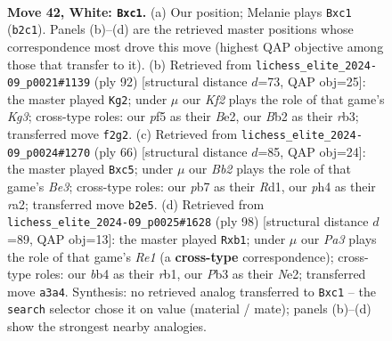 \documentclass[11pt]{article}
\begin{document}
\clearpage

\begin{figure}[p]\centering
\begin{subfigure}{0.46\textwidth}\centering
\resizebox{\linewidth}{!}{%
\newchessgame
\chessboard[
  setfen={1nb5/1p6/1n4k1/pN1p1pp1/1b4Pp/PP2P2P/1B2PK2/2rB4 w - - 0 42},
  showmover=false,
  pgfstyle=straightmove, color=movearrow, markmove={b2-c1}
]}
\caption{}
\end{subfigure}\hfill
\begin{subfigure}{0.46\textwidth}\centering
\resizebox{\linewidth}{!}{%
\newchessgame
\chessboard[
  setfen={R7/3b1pk1/2n1p2p/3pP1pP/1b1P2P1/1r1NB1K1/4BP2/8 w - - 8 47},
  showmover=false,
  pgfstyle=straightmove, color=movearrow, markmove={g3-g2}
]}
\caption{}
\end{subfigure}
\\[4pt]
\begin{subfigure}{0.46\textwidth}\centering
\resizebox{\linewidth}{!}{%
\newchessgame
\chessboard[
  setfen={2b2b2/1pp2k2/3p2p1/1PnPp3/2P1P1p1/3BB3/r3NPP1/3R2K1 w - - 7 34},
  showmover=false,
  pgfstyle=straightmove, color=movearrow, markmove={e3-c5}
]}
\caption{}
\end{subfigure}\hfill
\begin{subfigure}{0.46\textwidth}\centering
\resizebox{\linewidth}{!}{%
\newchessgame
\chessboard[
  setfen={3r4/1p3k2/2p5/p3Pnp1/PP3p1p/2B1bP1P/4N1PK/1r2R3 w - - 0 50},
  showmover=false,
  pgfstyle=straightmove, color=movearrow, markmove={e1-b1}
]}
\caption{}
\end{subfigure}
\caption{\textbf{Move 42, White: \texttt{Bxc1}.} (a) Our position; Melanie plays \texttt{Bxc1} (\texttt{b2c1}). Panels (b)--(d) are the retrieved master positions whose correspondence most drove this move (highest QAP objective among those that transfer to it). (b) Retrieved from \texttt{lichess\_elite\_2024-09\_p0021\#1139} (ply 92) [structural distance $d$=73, QAP obj=25]: the master played \texttt{Kg2}; under $\mu$ our \emph{Kf2} plays the role of that game's \emph{Kg3}; cross-type roles: our \emph{p}f5 as their \emph{B}e2, our \emph{B}b2 as their \emph{r}b3; transferred move \texttt{f2g2}. (c) Retrieved from \texttt{lichess\_elite\_2024-09\_p0024\#1270} (ply 66) [structural distance $d$=85, QAP obj=24]: the master played \texttt{Bxc5}; under $\mu$ our \emph{Bb2} plays the role of that game's \emph{Be3}; cross-type roles: our \emph{p}b7 as their \emph{R}d1, our \emph{p}h4 as their \emph{r}a2; transferred move \texttt{b2e5}. (d) Retrieved from \texttt{lichess\_elite\_2024-09\_p0025\#1628} (ply 98) [structural distance $d$=89, QAP obj=13]: the master played \texttt{Rxb1}; under $\mu$ our \emph{Pa3} plays the role of that game's \emph{Re1} (a \textbf{cross-type} correspondence); cross-type roles: our \emph{b}b4 as their \emph{r}b1, our \emph{P}b3 as their \emph{N}e2; transferred move \texttt{a3a4}. Synthesis: no retrieved analog transferred to \texttt{Bxc1} -- the \texttt{search} selector chose it on value (material / mate); panels (b)--(d) show the strongest nearby analogies.}
\label{fig:thought-m82}
\end{figure}
\end{document}
